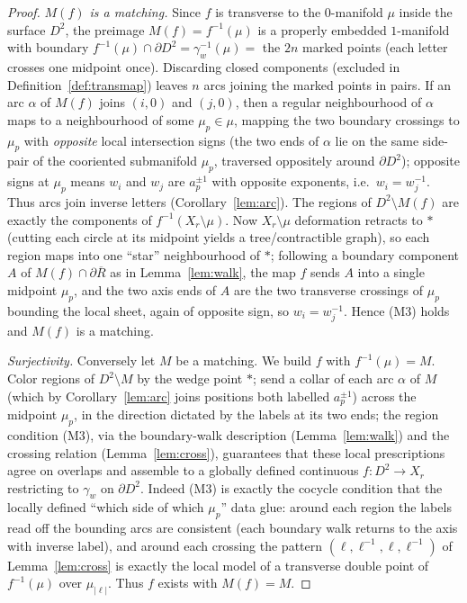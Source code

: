 \documentclass[11pt]{article}
\theoremstyle{definition}
\theoremstyle{remark}
\newcommand{\bdy}{\partial}
\newcommand{\rose}{X_r}
\begin{document}
\begin{proof}
\emph{$M(f)$ is a matching.} Since $f$ is transverse to the $0$-manifold $\mu$
inside the surface $D^2$, the preimage $M(f)=f^{-1}(\mu)$ is a properly embedded
$1$-manifold with boundary $f^{-1}(\mu)\cap\bdy D^2=\gamma_w^{-1}(\mu)=$ the $2n$
marked points (each letter crosses one midpoint once). Discarding closed
components (excluded in Definition~\ref{def:transmap}) leaves $n$ arcs joining the
marked points in pairs. If an arc $\alpha$ of $M(f)$ joins $(i,0)$ and $(j,0)$,
then a regular neighbourhood of $\alpha$ maps to a neighbourhood of some
$\mu_p\in\mu$, mapping the two boundary crossings to $\mu_p$ with \emph{opposite}
local intersection signs (the two ends of $\alpha$ lie on the same side-pair of
the cooriented submanifold $\mu_p$, traversed oppositely around $\bdy D^2$);
opposite signs at $\mu_p$ means $w_i$ and $w_j$ are $a_p^{\pm1}$ with opposite
exponents, i.e.\ $w_i=w_j^{-1}$. Thus arcs join inverse letters
(Corollary~\ref{lem:arc}). The regions of $D^2\setminus M(f)$ are exactly the
components of $f^{-1}(\rose\setminus\mu)$. Now $\rose\setminus\mu$ deformation
retracts to $\ast$ (cutting each circle at its midpoint yields a tree/contractible
graph), so each region maps into one ``star'' neighbourhood of $\ast$; following
a boundary component $A$ of $M(f)\cap\bdy\overline R$ as in
Lemma~\ref{lem:walk}, the map $f$ sends $A$ into a single midpoint $\mu_p$, and
the two axis ends of $A$ are the two transverse crossings of $\mu_p$ bounding the
local sheet, again of opposite sign, so $w_i=w_j^{-1}$. Hence (M3) holds and
$M(f)$ is a matching.

\emph{Surjectivity.} Conversely let $M$ be a matching. We build $f$ with
$f^{-1}(\mu)=M$. Color regions of $D^2\setminus M$ by the wedge point $\ast$; send
a collar of each arc $\alpha$ of $M$ (which by Corollary~\ref{lem:arc} joins
positions both labelled $a_p^{\pm1}$) across the midpoint $\mu_p$, in the
direction dictated by the labels at its two ends; the region condition (M3),
via the boundary-walk description (Lemma~\ref{lem:walk}) and the crossing
relation (Lemma~\ref{lem:cross}), guarantees that these local prescriptions agree
on overlaps and assemble to a globally defined continuous $f\colon D^2\to\rose$
restricting to $\gamma_w$ on $\bdy D^2$. Indeed (M3) is exactly the cocycle
condition that the locally defined ``which side of which $\mu_p$'' data glue:
around each region the labels read off the bounding arcs are consistent (each
boundary walk returns to the axis with inverse label), and around each crossing
the pattern $(\ell,\ell^{-1},\ell,\ell^{-1})$ of Lemma~\ref{lem:cross} is exactly
the local model of a transverse double point of $f^{-1}(\mu)$ over $\mu_{|\ell|}$.
Thus $f$ exists with $M(f)=M$.


\end{proof}
\end{document}
